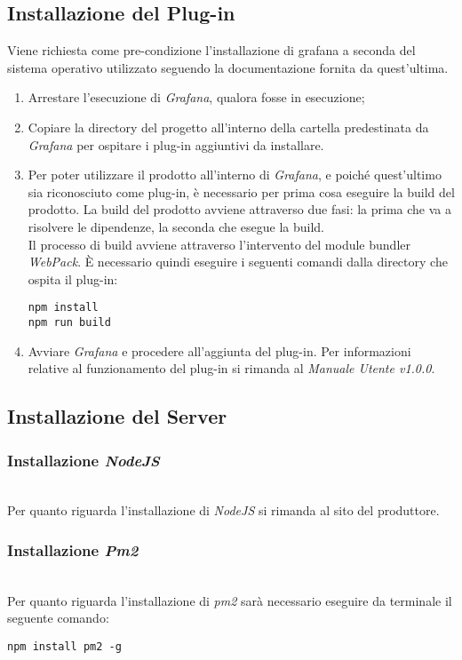 \subsection{Installazione del Plug-in}
Viene richiesta come pre-condizione l'installazione di grafana a seconda del sistema operativo utilizzato seguendo la documentazione fornita da quest'ultima. 
\begin{enumerate}
	\item Arrestare l'esecuzione di \textit{Grafana}, qualora fosse in esecuzione;	
	\item Copiare la directory del progetto all'interno della cartella predestinata da \textit{Grafana} per ospitare i plug-in aggiuntivi da installare.
	\item Per poter utilizzare il prodotto all'interno di \textit{Grafana}, e poiché quest'ultimo sia riconosciuto come plug-in, è necessario per prima cosa eseguire la build del prodotto.
	La build del prodotto avviene attraverso due fasi: la prima che va a risolvere le dipendenze, la seconda che esegue la build.\\
	Il processo di build avviene attraverso l'intervento del module bundler \textit{WebPack}.
	È necessario quindi eseguire i seguenti comandi dalla directory che ospita il plug-in:
\begin{center}
	\texttt{npm install}\\
	\texttt{npm run build}
\end{center}
\item Avviare \textit{Grafana} e procedere all'aggiunta del plug-in.
Per informazioni relative al funzionamento del plug-in si rimanda al \textit{Manuale Utente v1.0.0}.
\end{enumerate}

\subsection{Installazione del Server}\label{installazione_server}
\subsubsection{Installazione \textit{NodeJS}}\-\\
Per quanto riguarda l'installazione di \textit{NodeJS} si rimanda al sito del produttore.

\subsubsection{Installazione \textit{Pm2}}\-\\
Per quanto riguarda l'installazione di \textit{pm2} sarà necessario eseguire da terminale il seguente comando:
\begin{center}
	\texttt{npm install pm2 -g}
\end{center}
	
